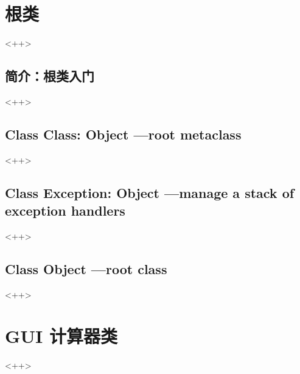 \section{根类}
<++>

\subsection{简介：根类入门}
<++>

\subsection{Class Class: Object ---root metaclass}
<++>

\subsection{Class Exception: Object ---manage a stack of exception handlers}
<++>

\subsection{Class Object ---root class}
<++>

\section{GUI 计算器类}
<++>

